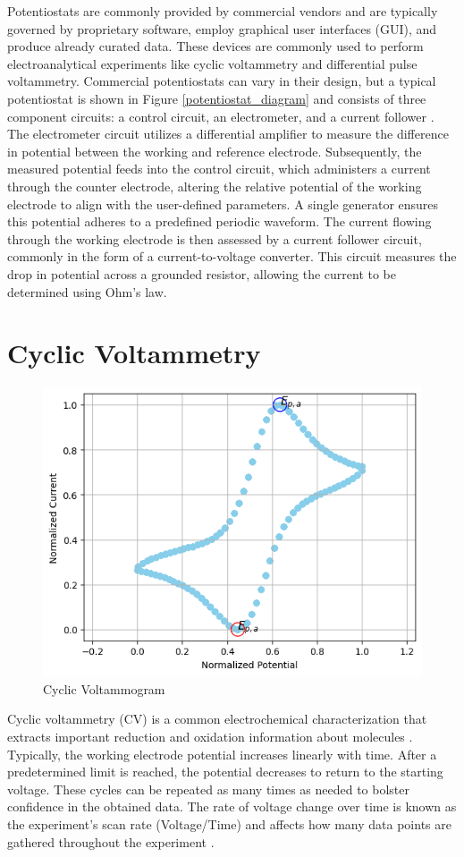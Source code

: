 Potentiostats are commonly provided by commercial vendors and are typically governed by proprietary software, employ graphical user interfaces (GUI), and produce already curated data. These devices are commonly used to perform electroanalytical experiments like cyclic voltammetry and differential pulse voltammetry. Commercial potentiostats can vary in their design, but a typical potentiostat is shown in Figure \ref{potentiostat_diagram} and consists of three component circuits: a control circuit, an electrometer, and a current follower \cite{WAIN20211}. The electrometer circuit utilizes a differential amplifier to measure the difference in potential between the working and reference electrode. Subsequently, the measured potential feeds into the control circuit, which administers a current through the counter electrode, altering the relative potential of the working electrode to align with the user-defined parameters. A single generator ensures this potential adheres to a predefined periodic waveform. The current flowing through the working electrode is then assessed by a current follower circuit, commonly in the form of a current-to-voltage converter. This circuit measures the drop in potential across a grounded resistor, allowing the current to be determined using Ohm's law.
\section{Cyclic Voltammetry}
\begin{figure}[h!]
  \centering
    \includegraphics[width=1.0\textwidth]{figures/cv_example.png}
    \caption{Cyclic Voltammogram}
    \label{cv_example}
\end{figure}
Cyclic voltammetry (CV) is a common electrochemical characterization that extracts important reduction and oxidation information about molecules \cite{doi:10.1021/ac60210a007}. Typically, the working electrode potential increases linearly with time. After a predetermined limit is reached, the potential decreases to return to the starting voltage. These cycles can be repeated as many times as needed to bolster confidence in the obtained data. The rate of voltage change over time is known as the experiment's scan rate (Voltage/Time) and affects how many data points are gathered throughout the experiment \cite{https://doi.org/10.1002/anie.198408313}. 


